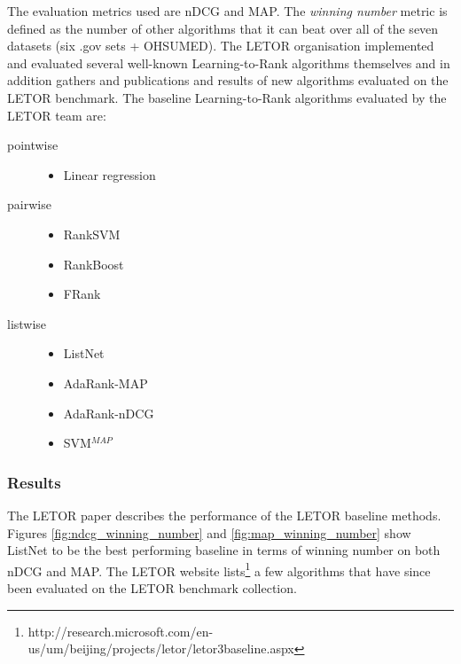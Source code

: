 The evaluation metrics used are \ac{nDCG} and \ac{MAP}. The \emph{winning number} metric is defined as the number of other algorithms that it can beat over all of the seven datasets (six .gov sets + OHSUMED). The LETOR organisation implemented and evaluated several well-known Learning-to-Rank algorithms themselves and in addition gathers and publications and results of new algorithms evaluated on the LETOR benchmark. The baseline Learning-to-Rank algorithms evaluated by the LETOR team are:
\begin{description}
\item[pointwise]{\leavevmode
	\begin{itemize}
	\item Linear regression
	\end{itemize}}
\item[pairwise]{\leavevmode
	\begin{itemize}
	\item Rank\ac{SVM} \cite{Herbrich1999,Joachims2002}
	\item RankBoost \cite{Freund2003}
	\item FRank \cite{Tsai2007}
	\end{itemize}}
\item[listwise]{\leavevmode
	\begin{itemize}
	\item ListNet \cite{Cao2007}
	\item AdaRank-MAP \cite{Xu2007}
	\item AdaRank-nDCG \cite{Xu2007}
	\item \ac{SVM}$^{MAP}$ \cite{Yue2007} 
	\end{itemize}}
\end{description} 

\subsubsection{Results}
The LETOR paper \cite{Qin2010} describes the performance of the LETOR baseline methods. Figures \ref{fig:ndcg_winning_number} and \ref{fig:map_winning_number} show ListNet to be the best performing baseline in terms of winning number on both \ac{nDCG} and \ac{MAP}. The LETOR website lists\footnote{http://research.microsoft.com/en-us/um/beijing/projects/letor/letor3baseline.aspx} a few algorithms that have since been evaluated on the LETOR benchmark collection.\\

